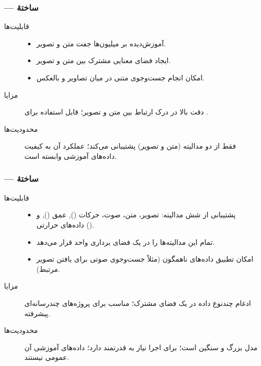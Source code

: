 \documentclass{article}
\begin{document}
\subsubsection{ — ساختهٔ }
\begin{description}
\item[قابلیت‌ها]
\begin{itemize}
\item آموزش‌دیده بر میلیون‌ها جفت متن و تصویر.

\item ایجاد فضای معنایی مشترک بین متن و تصویر.
\item امکان انجام جست‌وجوی متنی در میان تصاویر و بالعکس.

\end{itemize}
\item[مزایا] دقت بالا در درک ارتباط بین متن و تصویر؛ قابل استفاده برای .

\item[محدودیت‌ها] فقط از دو مدالیته (متن و تصویر) پشتیبانی می‌کند؛ عملکرد آن به کیفیت داده‌های آموزشی وابسته است.
\end{description}

\subsubsection{ — ساختهٔ }

\begin{description}
\item[قابلیت‌ها]
\begin{itemize}
\item پشتیبانی از شش مدالیته: تصویر، متن، صوت، حرکات (), عمق (), و داده‌های حرارتی ().

\item تمام این مدالیته‌ها را در یک فضای برداری واحد قرار می‌دهد.

\item امکان تطبیق داده‌های ناهمگون (مثلاً جست‌وجوی صوتی برای یافتن تصویر مرتبط).

\end{itemize}
\item[مزایا] ادغام چندنوع داده در یک فضای  مشترک؛ مناسب برای پروژه‌های چندرسانه‌ای پیشرفته.

\item[محدودیت‌ها] مدل بزرگ و سنگین است؛ برای اجرا نیاز به  قدرتمند دارد؛ داده‌های آموزشی آن عمومی نیستند.
\end{description}
\end{document}
